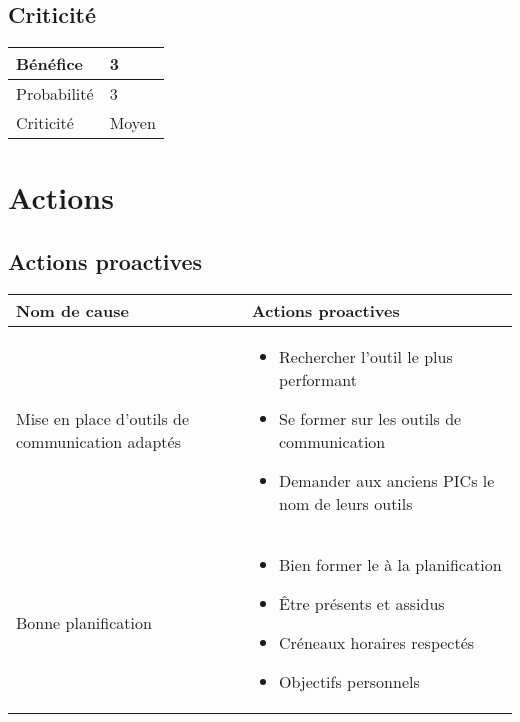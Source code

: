 \subsection*{Criticité}

\begin{table}[H]
\centering
	\begin{tabularx}{16.8cm}{|>{\columncolor{gray!40}}X|X|}
	\hline
	Bénéfice & 3\\
	\hline
	Probabilité & 3\\
	\hline
	Criticité & Moyen\\
	\hline
	\end{tabularx}
\end{table}
\newpage

\section*{Actions}
\subsection*{Actions proactives}

{\centering
	\begin{longtable}{|p{7cm}|p{7cm}|}
	\hline
	\rowcolor{gray!40} Nom de cause & Actions proactives \\
	\hline
	 Mise en place d'outils de communication adaptés & \begin{itemize}
	 	\item Rechercher l'outil le plus performant
	 	\item Se former sur les outils de communication
	 	\item Demander aux anciens PICs le nom de leurs outils
	 \end{itemize} \\
	\hline
	Bonne planification & \begin{itemize}
		\item Bien former le \CP{} à la planification
		\item Être présents et assidus
		\item Créneaux horaires respectés
		\item Objectifs personnels
	\end{itemize} \\
	\hline
	\end{longtable}}



